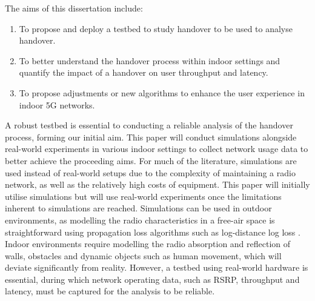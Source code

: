 

The aims of this dissertation include:  
\begin{enumerate}
    \item To propose and deploy a testbed to study handover to be used to analyse handover.
    \item To better understand the handover process within indoor settings and quantify the impact of a handover on user throughput and latency.
    \item To propose adjustments or new algorithms to enhance the user experience in indoor 5G networks.
\end{enumerate}
A robust testbed is essential to conducting a reliable analysis of the handover process, forming our initial aim. This paper will conduct simulations alongside real-world experiments in various indoor settings to collect network usage data to better achieve the proceeding aims. For much of the literature, simulations are used instead of real-world setups due to the complexity of maintaining a radio network, as well as the relatively high costs of equipment. This paper will initially utilise simulations but will use real-world experiments once the limitations inherent to simulations are reached. Simulations can be used in outdoor environments, as modelling the radio characteristics in a free-air space is straightforward using propagation loss algorithms such as log-distance log loss \cite{sun_path_2015}. Indoor environments require modelling the radio absorption and reflection of walls, obstacles and dynamic objects such as human movement, which will deviate significantly from reality. However, a testbed using real-world hardware is essential, during which network operating data, such as RSRP, throughput and latency, must be captured for the analysis to be reliable. 

